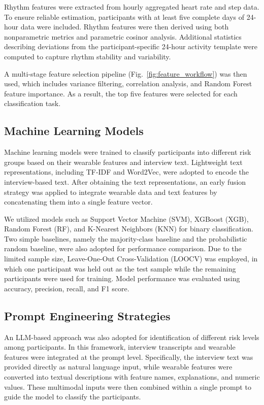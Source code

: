 \documentclass[letterpaper, 10 pt, conference]{ieeeconf}  %
\begin{document}
Rhythm features were extracted from hourly aggregated heart rate and step data\cite{heartrate}. To ensure reliable estimation, participants with at least five complete days of 24-hour data were included. Rhythm features were then derived using both nonparametric metrics and parametric cosinor analysis. Additional statistics describing deviations from the participant-specific 24-hour activity template were computed to capture rhythm stability and variability. 

A multi-stage feature selection pipeline (Fig.~\ref{fig:feature_workflow}) was then used, which includes variance filtering, correlation analysis, and Random Forest feature importance. As a result, the top five features were selected for each classification task.

\subsection{Machine Learning Models}
Machine learning models were trained to classify participants into different risk groups based on their wearable features and interview text. Lightweight text representations, including TF-IDF\cite{tf-idf} and Word2Vec\cite{word2vec}, were adopted to encode the interview-based text. After obtaining the text representations, an early fusion strategy was applied to integrate wearable data and text features by concatenating them into a single feature vector.

We utilized models such as Support Vector Machine (SVM)\cite{cortes1995support}, XGBoost (XGB)\cite{xgboost}, Random Forest (RF)\cite{rf}, and K-Nearest Neighbors (KNN)\cite{knn} for binary classification. Two simple baselines, namely the majority-class baseline and the probabilistic random baseline, were also adopted for performance comparison.  Due to the limited sample size, Leave-One-Out Cross-Validation (LOOCV)\cite{loocv} was employed, in which one participant was held out as the test sample while the remaining participants were used for training. Model performance was evaluated using accuracy, precision, recall, and F1 score.

\subsection{Prompt Engineering Strategies}
An LLM-based approach was also adopted for identification of different risk levels among participants. In this framework, interview transcripts and wearable features were integrated at the prompt level. Specifically, the interview text was provided directly as natural language input, while wearable features were converted into textual descriptions with feature names, explanations, and numeric values. These multimodal inputs were then combined within a single prompt to guide the model to classify the participants.
\end{document}
